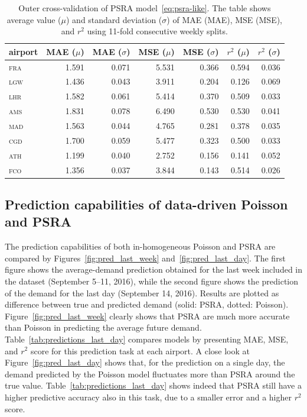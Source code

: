 \documentclass[final,review]{elsarticle}
\newcommand{\airp}[1]{\textcolor{#1}{\textsc{#1}}}
\begin{document}
\begin{table}
  \caption{Outer cross-validation of \acs{PSRA} model~\eqref{eq:psra-like}. The table shows average value (\(\mu\)) and standard deviation (\(\sigma\)) of \acl{MAE} (\acs{MAE}), \acl{MSE} (\acs{MSE}), and \(r^2\) using 11-fold consecutive weekly splits.}
  \label{tab:outer_cv}
  \centering
  \begin{tabular}{lrrrrrr}
    \toprule
    airport &  \acs{MAE} (\(\mu\)) &  \acs{MAE} (\(\sigma\)) &  \acs{MSE} (\(\mu\)) &  \acs{MSE} (\(\sigma\)) &  \(r^2\) (\(\mu\)) &  \(r^2\) (\(\sigma\)) \\
    \midrule
    \airp{fra} & 1.591 & 0.071 & 5.531 & 0.366 & 0.594 & 0.036 \\
    \airp{lgw} & 1.436 & 0.043 & 3.911 & 0.204 & 0.126 & 0.069 \\
    \airp{lhr} & 1.582 & 0.061 & 5.414 & 0.370 & 0.509 & 0.033 \\
    \airp{ams} & 1.831 & 0.078 & 6.490 & 0.530 & 0.530 & 0.041 \\
    \airp{mad} & 1.563 & 0.044 & 4.765 & 0.281 & 0.378 & 0.035 \\
    \airp{cgd} & 1.700 & 0.059 & 5.477 & 0.323 & 0.500 & 0.033 \\
    \airp{ath} & 1.199 & 0.040 & 2.752 & 0.156 & 0.141 & 0.052 \\
    \airp{fco} & 1.356 & 0.037 & 3.844 & 0.143 & 0.514 & 0.026 \\
    \bottomrule
  \end{tabular}
\end{table}

\subsection{Prediction capabilities of data-driven Poisson and \acs{PSRA}}\label{sec:comparison}

The prediction capabilities of both in-homogeneous Poisson and \ac{PSRA} are compared by Figures~\ref{fig:pred_last_week} and~\ref{fig:pred_last_day}.
The first figure shows the average-demand prediction obtained for the last week included in the dataset (September 5--11, 2016), while the second figure shows the prediction of the demand for the last day (September 14, 2016).
Results are plotted as difference between true and predicted demand (solid: \ac{PSRA}, dotted: Poisson).
Figure~\ref{fig:pred_last_week} clearly shows that \ac{PSRA} are much more accurate than Poisson in predicting the average future demand.
Table~\ref{tab:predictions_last_day} compares models by presenting \ac{MAE}, \ac{MSE}, and \(r^2\) score for this prediction task at each airport.
A close look at Figure~\ref{fig:pred_last_day} shows that, for the prediction on a single day, the demand predicted by the Poisson model fluctuates more than \ac{PSRA} around the true value.
Table~\ref{tab:predictions_last_day} shows indeed that \ac{PSRA} still have a higher predictive accuracy also in this task, due to a smaller error and a higher \(r^2\) score.
\end{document}
